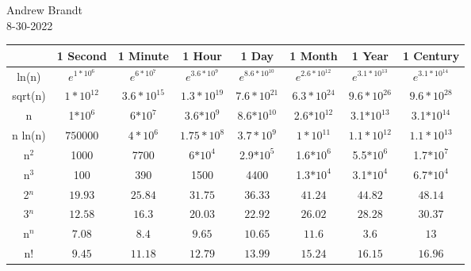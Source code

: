 \documentclass[48pt]{article}
\begin{document}
\noindent
Andrew Brandt
\\
8-30-2022
\vspace{20mm}
\Large
\begin{center}
    \begin{tabular}{ |c||c|c|c|c|c|c|c|} 
     \hline
     & 1 Second & 1 Minute & 1 Hour & 1 Day & 1 Month & 1 Year & 1 Century\\ 
     \hline
     \hline
     ln(n) & $e^{1*10^6}$ & $e^{6*10^7}$ & $e^{3.6*10^9}$ & $e^{8.6*10^{10}}$ & $e^{2.6*10^{12}}$ & $e^{3.1*10^{13}}$ & $e^{3.1*10^{14}}$ \\ 
     \hline
     sqrt(n) & $1*10^{12}$ & $3.6*10^{15}$ & $1.3*10^{19}$ & $7.6*10^{21}$ & $6.3*10^{24}$ & $9.6*10^{26}$ & $9.6*10^{28}$\\ 
     \hline
     n & 1$*10^6$& 6$*10^7$& 3.6$*10^9$ & 8.6$*10^{10}$ & 2.6$*10^{12}$ & 3.1$*10^{13}$ & 3.1$*10^{14}$ \\ 
     \hline
     n ln(n) & $750000$ & $4*10^6$ & $1.75*10^8$ & $3.7*10^9$ & $1*10^{11}$ & $1.1*10^{12}$ & $1.1*10^{13}$\\ 
     \hline
     n$^2$ & 1000 & 7700 & 6$*10^4$ &  2.9$*10^5$ & 1.6$*10^6$ &  5.5$*10^6$& 1.7$*10^7$ \\ 
     \hline
     n$^3$ & 100 & 390 & 1500 & 4400 & 1.3$*10^4$ & 3.1$*10^4$ & 6.7$*10^4$\\ 
     \hline
     2$^n$ & $19.93$ & $25.84$ & $31.75$ & $36.33$ & $41.24$ & $44.82$ & $48.14$\\ 
     \hline
     3$^n$ & $12.58$ & $16.3$ & $20.03$ & $22.92$ & $26.02$ & $28.28$ & $30.37$\\ 
     \hline
     n$^n$ & $7.08$ & $8.4$ & $9.65$ & $10.65$ & $11.6$ & $3.6$ & $13$ \\ 
     \hline
     n! & $9.45$ & $11.18$ & $12.79$ & $13.99$ & $15.24$ & $16.15$ & $16.96$\\ 
     \hline
    \end{tabular}
    \end{center}
\end{document}
